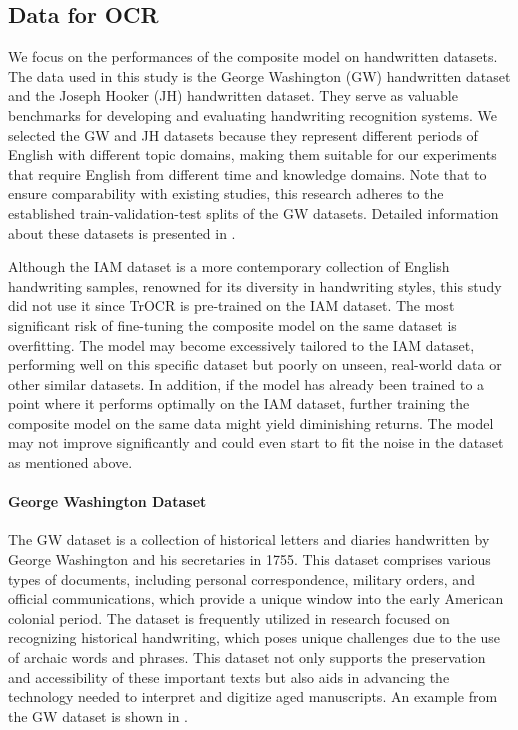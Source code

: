 \subsection{Data for OCR} 
\label{subsec:3_data_for_ocr}
We focus on the performances of the composite model on handwritten datasets. The data used in this study is the George Washington (GW) handwritten dataset and the Joseph Hooker (JH) handwritten dataset. They serve as valuable benchmarks for developing and evaluating handwriting recognition systems. We selected the GW and JH datasets because they represent different periods of English with different topic domains, making them suitable for our experiments that require English from different time and knowledge domains. Note that to ensure comparability with existing studies, this research adheres to the established train-validation-test splits of the GW datasets. Detailed information about these datasets is presented in .

Although the IAM dataset is a more contemporary collection of English handwriting samples, renowned for its diversity in handwriting styles, this study did not use it since TrOCR is pre-trained on the IAM dataset. The most significant risk of fine-tuning the composite model on the same dataset is overfitting. The model may become excessively tailored to the IAM dataset, performing well on this specific dataset but poorly on unseen, real-world data or other similar datasets. In addition, if the model has already been trained to a point where it performs optimally on the IAM dataset, further training the composite model on the same data might yield diminishing returns. The model may not improve significantly and could even start to fit the noise in the dataset as mentioned above.

\paragraph*{George Washington Dataset}
\label{par:3_george_washington_dataset}
The GW dataset is a collection of historical letters and diaries handwritten by George Washington and his secretaries in 1755. This dataset comprises various types of documents, including personal correspondence, military orders, and official communications, which provide a unique window into the early American colonial period. The dataset is frequently utilized in research focused on recognizing historical handwriting, which poses unique challenges due to the use of archaic words and phrases. This dataset not only supports the preservation and accessibility of these important texts but also aids in advancing the technology needed to interpret and digitize aged manuscripts. An example from the GW dataset is shown in .

